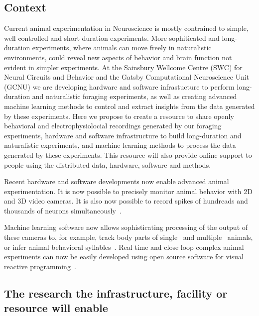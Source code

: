 \subsection{Context}

Current animal experimentation in Neuroscience is mostly contrained to simple,
well controlled and short duration experiments. 
%
More sophiticated and long-duration experiments, where animals can move freely
in naturalistic environments, could reveal new aspects of behavior and brain
function not evident in simpler experiments.
%
At the Sainsbury Wellcome Centre (SWC) for Neural Circuits and Behavior and the
Gatsby Computational Neuroscience Unit (GCNU) we are developing hardware and
software infrastucture to perform long-duration and naturalistic foraging
experiments, as well as creating advanced machine learning methods to control
and extract insights from the data generated by these experiments.
%
Here we propose to create a resource to share openly behavioral and
electrophysiolocial recordings generated by our foraging experiments, hardware
and software infrastructure to build long-duration and naturalistic
experiments, and machine learning methods to process the data generated by
these experiments. This resource will also provide online support to people
using the distributed data, hardware, software and methods.

%
Recent hardware and software developments now enable advanced animal
experimentation.
% 
It is now possible to precisely monitor animal behavior with 2D and 3D video
cameras.
%
It is also now possible to record spikes of hundreads and thousands of neurons
simultaneously~\citep{neuropixels}.

Machine learning software now allows sophisticating processing of the output of
these cameras to, for example, track body parts of single~\citep{deeplabCut}
and multiple~\citep{sleap} animals, or infer animal behavioral
syllables~\citep{moseq}.
%
Real time and close loop complex animal experiments can now be easily developed
using open source software for visual reactive programming~\citep{bonsai}.

\subsection{The research the infrastructure, facility or resource will enable}

